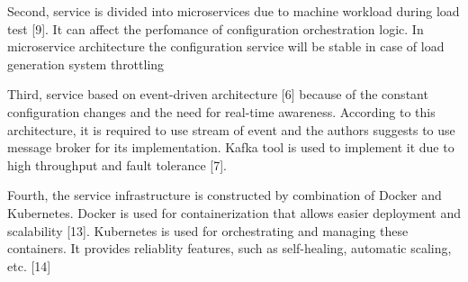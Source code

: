 Second, service is divided into microservices due to machine workload during load test [9].
It can affect the perfomance of configuration orchestration logic.
In microservice architecture the configuration service will be stable in case of load generation system throttling

Third, service based on event-driven architecture [6] because of the constant configuration changes and the need for real-time awareness. According to this architecture, it is required to use stream of event and the authors suggests to use message broker for its implementation. Kafka tool is used to implement it due to high throughput and fault tolerance [7].

Fourth, the service infrastructure is constructed by combination of Docker and Kubernetes.
Docker is used for containerization that allows easier deployment and scalability [13].
Kubernetes is used for orchestrating and managing these containers.
It provides reliablity features, such as self-healing, automatic scaling, etc. [14]

